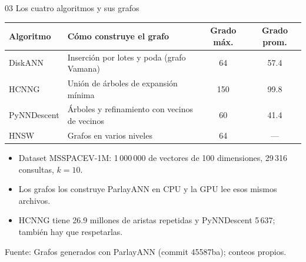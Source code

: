 \documentclass[aspectratio=169,10pt]{beamer}
\newcommand{\fuente}[1]{\vfill{\scriptsize\color{gray}Fuente: #1}}
\begin{document}
\begin{frame}{03 \quad Los cuatro algoritmos y sus grafos}
  \centering
  \begin{tabular}{llcc}
    \toprule
    Algoritmo & Cómo construye el grafo & Grado máx. & Grado prom. \\
    \midrule
    DiskANN     & Inserción por lotes y poda (grafo Vamana)     & 64  & 57.4 \\
    HCNNG       & Unión de árboles de expansión mínima           & 150 & 99.8 \\
    PyNNDescent & Árboles y refinamiento con vecinos de vecinos  & 60  & 41.4 \\
    HNSW        & Grafos en varios niveles                       & 64  & --- \\
    \bottomrule
  \end{tabular}
  \vspace{8pt}
  \begin{itemize}
    \item Dataset MSSPACEV-1M: 1\,000\,000 de vectores de 100 dimensiones, 29\,316 consultas, $k = 10$.
    \item Los grafos los construye ParlayANN en CPU y la GPU lee esos mismos archivos.
    \item HCNNG tiene 26.9 millones de aristas repetidas y PyNNDescent 5\,637; también
          hay que respetarlas.
  \end{itemize}
  \fuente{Grafos generados con ParlayANN (commit 45587ba); conteos propios.}
\end{frame}
\end{document}
